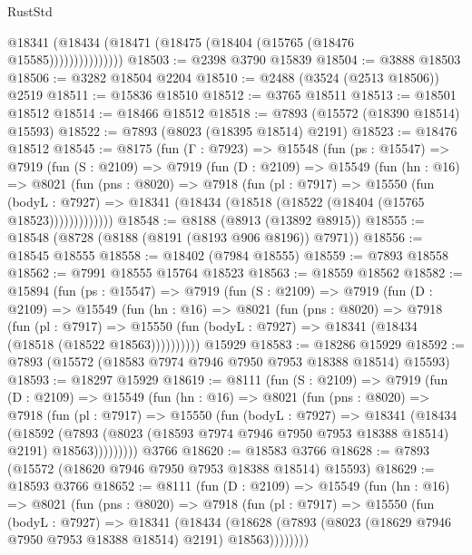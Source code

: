 \begin{lexlean}{RustStd}
\begin{coremodule}
                    @18341 (@18434 (@18471 (@18475 (@18404 (@15765 (@18476 @15585)))))))))))))))
@18503 := @2398 @3790 @15839
@18504 := @3888 @18503
@18506 := @3282 @18504 @2204
@18510 := @2488 (@3524 (@2513 @18506)) @2519
@18511 := @15836 @18510
@18512 := @3765 @18511
@18513 := @18501 @18512
@18514 := @18466 @18512
@18518 := @7893 (@15572 (@18390 @18514) @15593)
@18522 := @7893 (@8023 (@18395 @18514) @2191)
@18523 := @18476 @18512
@18545 := @8175
    (fun (Γ : @7923) =>
    @15548
      (fun (ps : @15547) =>
      @7919
        (fun (S : @2109) =>
        @7919
          (fun (D : @2109) =>
          @15549
            (fun (hn : @16) =>
            @8021
              (fun (pns : @8020) =>
              @7918
                (fun (pl : @7917) =>
                @15550
                  (fun (bodyL : @7927) =>
                  @18341 (@18434 (@18518 (@18522 (@18404 (@15765 @18523)))))))))))))
@18548 := @8188 (@8913 (@13892 @8915))
@18555 := @18548 (@8728 (@8188 (@8191 (@8193 @906 @8196)) @7971))
@18556 := @18545 @18555
@18558 := @18402 (@7984 @18555)
@18559 := @7893 @18558
@18562 := @7991 @18555 @15764 @18523
@18563 := @18559 @18562
@18582 := @15894
    (fun (ps : @15547) =>
    @7919
      (fun (S : @2109) =>
      @7919
        (fun (D : @2109) =>
        @15549
          (fun (hn : @16) =>
          @8021
            (fun (pns : @8020) =>
            @7918
              (fun (pl : @7917) =>
              @15550 (fun (bodyL : @7927) => @18341 (@18434 (@18518 (@18522 @18563))))))))))
    @15929
@18583 := @18286 @15929
@18592 := @7893 (@15572 (@18583 @7974 @7946 @7950 @7953 @18388 @18514) @15593)
@18593 := @18297 @15929
@18619 := @8111
    (fun (S : @2109) =>
    @7919
      (fun (D : @2109) =>
      @15549
        (fun (hn : @16) =>
        @8021
          (fun (pns : @8020) =>
          @7918
            (fun (pl : @7917) =>
            @15550
              (fun (bodyL : @7927) =>
              @18341
                (@18434
                  (@18592
                    (@7893
                      (@8023 (@18593 @7974 @7946 @7950 @7953 @18388 @18514) @2191)
                      @18563)))))))))
    @3766
@18620 := @18583 @3766
@18628 := @7893 (@15572 (@18620 @7946 @7950 @7953 @18388 @18514) @15593)
@18629 := @18593 @3766
@18652 := @8111
    (fun (D : @2109) =>
    @15549
      (fun (hn : @16) =>
      @8021
        (fun (pns : @8020) =>
        @7918
          (fun (pl : @7917) =>
          @15550
            (fun (bodyL : @7927) =>
            @18341
              (@18434
                (@18628 (@7893 (@8023 (@18629 @7946 @7950 @7953 @18388 @18514) @2191) @18563))))))))

\end{coremodule}
\end{lexlean}
